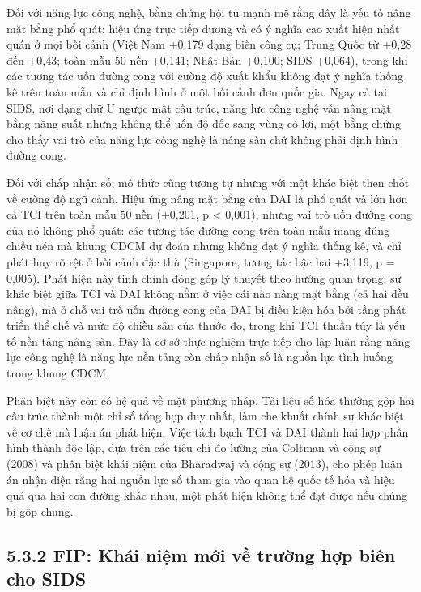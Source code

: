 \documentclass[
  a4paper,
  13pt]{extreport}
\begin{document}
Đối với năng lực công nghệ, bằng chứng hội tụ mạnh mẽ rằng đây là yếu tố
nâng mặt bằng phổ quát: hiệu ứng trực tiếp dương và có ý nghĩa cao xuất
hiện nhất quán ở mọi bối cảnh (Việt Nam +0,179 dạng biến công cụ; Trung
Quốc từ +0,28 đến +0,43; toàn mẫu 50 nền +0,141; Nhật Bản +0,100; SIDS
+0,064), trong khi các tương tác uốn đường cong với cường độ xuất khẩu
không đạt ý nghĩa thống kê trên toàn mẫu và chỉ định hình ở một bối cảnh
đơn quốc gia. Ngay cả tại SIDS, nơi dạng chữ U ngược mất cấu trúc, năng
lực công nghệ vẫn nâng mặt bằng năng suất nhưng không thể uốn độ dốc
sang vùng có lợi, một bằng chứng cho thấy vai trò của năng lực công nghệ
là nâng sàn chứ không phải định hình đường cong.

Đối với chấp nhận số, mô thức cũng tương tự nhưng với một khác biệt then
chốt về cường độ ngữ cảnh. Hiệu ứng nâng mặt bằng của DAI là phổ quát và
lớn hơn cả TCI trên toàn mẫu 50 nền (+0,201, p \textless{} 0,001), nhưng
vai trò uốn đường cong của nó không phổ quát: các tương tác đường cong
trên toàn mẫu mang đúng chiều nén mà khung CDCM dự đoán nhưng không đạt
ý nghĩa thống kê, và chỉ phát huy rõ rệt ở bối cảnh đặc thù (Singapore,
tương tác bậc hai +3,119, p = 0,005). Phát hiện này tinh chỉnh đóng góp
lý thuyết theo hướng quan trọng: sự khác biệt giữa TCI và DAI không nằm
ở việc cái nào nâng mặt bằng (cả hai đều nâng), mà ở chỗ vai trò uốn
đường cong của DAI bị điều kiện hóa bởi tầng phát triển thể chế và mức
độ chiều sâu của thước đo, trong khi TCI thuần túy là yếu tố nền tảng
nâng sàn. Đây là cơ sở thực nghiệm trực tiếp cho lập luận rằng năng lực
công nghệ là năng lực nền tảng còn chấp nhận số là nguồn lực tình huống
trong khung CDCM.

Phân biệt này còn có hệ quả về mặt phương pháp. Tài liệu số hóa thường
gộp hai cấu trúc thành một chỉ số tổng hợp duy nhất, làm che khuất chính
sự khác biệt về cơ chế mà luận án phát hiện. Việc tách bạch TCI và DAI
thành hai hợp phần hình thành độc lập, dựa trên các tiêu chí đo lường
của Coltman và cộng sự (2008) và phân biệt khái niệm của Bharadwaj và
cộng sự (2013), cho phép luận án nhận diện rằng hai nguồn lực số tham
gia vào quan hệ quốc tế hóa và hiệu quả qua hai con đường khác nhau, một
phát hiện không thể đạt được nếu chúng bị gộp chung.

\hypertarget{fip-khuxe1i-niux1ec7m-mux1edbi-vux1ec1-trux1b0ux1eddng-hux1ee3p-biuxean-cho-sids}{%
\subsection{5.3.2 FIP: Khái niệm mới về trường hợp biên cho
SIDS}\label{fip-khuxe1i-niux1ec7m-mux1edbi-vux1ec1-trux1b0ux1eddng-hux1ee3p-biuxean-cho-sids}}
\end{document}
